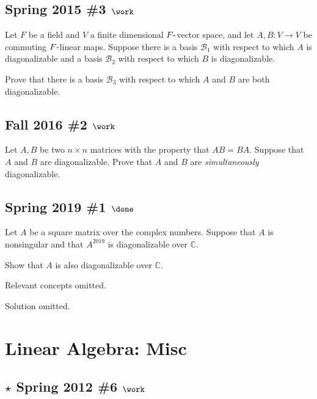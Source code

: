 \hypertarget{spring-2015-3-work}{%
\subsection{\texorpdfstring{Spring 2015 \#3
\(\work\)}{Spring 2015 \#3 \textbackslash work}}\label{spring-2015-3-work}}

Let \(F\) be a field and \(V\) a finite dimensional
\(F{\hbox{-}}\)vector space, and let \(A, B: V\to V\) be commuting
\(F{\hbox{-}}\)linear maps. Suppose there is a basis \({\mathcal{B}}_1\)
with respect to which \(A\) is diagonalizable and a basis
\({\mathcal{B}}_2\) with respect to which \(B\) is diagonalizable.

Prove that there is a basis \({\mathcal{B}}_3\) with respect to which
\(A\) and \(B\) are both diagonalizable.

\hypertarget{fall-2016-2-work}{%
\subsection{\texorpdfstring{Fall 2016 \#2
\(\work\)}{Fall 2016 \#2 \textbackslash work}}\label{fall-2016-2-work}}

Let \(A, B\) be two \(n\times n\) matrices with the property that
\(AB = BA\). Suppose that \(A\) and \(B\) are diagonalizable. Prove that
\(A\) and \(B\) are \emph{simultaneously} diagonalizable.

\hypertarget{spring-2019-1-done}{%
\subsection{\texorpdfstring{Spring 2019 \#1
\(\done\)}{Spring 2019 \#1 \textbackslash done}}\label{spring-2019-1-done}}

Let \(A\) be a square matrix over the complex numbers. Suppose that
\(A\) is nonsingular and that \(A^{2019}\) is diagonalizable over
\({\mathbb{C}}\).

Show that \(A\) is also diagonalizable over \({\mathbb{C}}\).

Relevant concepts omitted.

Solution omitted.

\hypertarget{linear-algebra-misc}{%
\section{Linear Algebra: Misc}\label{linear-algebra-misc}}

\hypertarget{star-spring-2012-6-work}{%
\subsection{\texorpdfstring{\(\star\) Spring 2012 \#6
\(\work\)}{\textbackslash star Spring 2012 \#6 \textbackslash work}}\label{star-spring-2012-6-work}}

